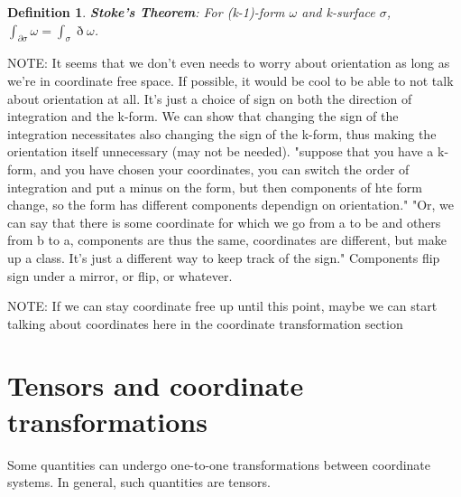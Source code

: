 \documentclass{book}
\newtheorem{defn}[equation]{Definition}
\begin{document}
 



\begin{defn}
	\textbf{Stoke's Theorem}: For (k-1)-form $\omega$ and k-surface $\sigma$, $\int_{\partial \sigma}\omega = \int_{\sigma}\eth\omega$. 
\end{defn}

NOTE: It seems that we don't even needs to worry about orientation as long as we're in coordinate free space. If possible, it would be cool to be able to not talk about orientation at all. It's just a choice of sign on both the direction of integration and the k-form. We can show that changing the sign of the integration necessitates also changing the sign of the k-form, thus making the orientation itself unnecessary (may not be needed). "suppose that you have a k-form, and you have chosen your coordinates, you can switch the order of integration and put a minus on the form, but then components of hte form change, so the form has different components dependign on orientation." "Or, we can say that there is some coordinate for which we go from a to be and others from b to a, components are thus the same, coordinates are different, but make up a class. It's just a different way to keep track of the sign." Components flip sign under a mirror, or flip, or whatever. 

NOTE: If we can stay coordinate free up until this point, maybe we can start talking about coordinates here in the coordinate transformation section
\section{Tensors and coordinate transformations}
Some quantities can undergo one-to-one transformations between coordinate systems. In general, such quantities are tensors. 
\end{document}
